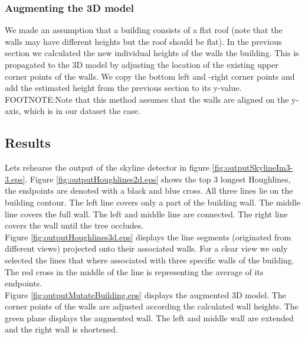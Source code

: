 \documentclass[10pt]{article}
\begin{document}
\subsubsection{Augmenting the 3D model} %
	We made an assumption that a building consists of a flat roof (note that the walls may have different heights but the roof should be flat).
	In the previous section we calculated the new individual heights of the walls the building. 
	This is propagated to the 3D model by adjusting the location of the existing upper corner points of the walls. We copy the bottom left and -right corner points and add the estimated height from the previous section to its y-value.
	FOOTNOTE:Note that this method assumes that the walls are aligned on the y-axis, which is in our dataset the case.

	

\subsection{Results}
Lets rehearse the output of the skyline detector in figure \ref{fig:outputSkylineIm3-3.eps}.
Figure \ref{fig:outputHoughlines2d.eps} shows the top 3 longest Houghlines, the
endpoints are denoted with a black and blue cross. All three lines lie on the
building contour.  The left line covers only a part of the building wall. The
middle line covers the full wall. The left and middle line are connected. The
right line covers the wall until the tree occludes.\\

Figure \ref{fig:outputHoughlines3d.eps} displays the line segments (originated from
different views) projected onto their associated walls.  For a clear view we
only selected the lines that where associated with three specific walls of the building.  
The red cross in the middle of the line is representing the average of its endpoints.\\

Figure \ref{fig:outputMutateBuilding.eps} displays the augmented 3D model. The
corner points of the walls are adjusted according the calculated wall heights.
The green plane displays the augmented wall. The left and middle wall are extended
and the right wall is shortened.\\
\end{document}
